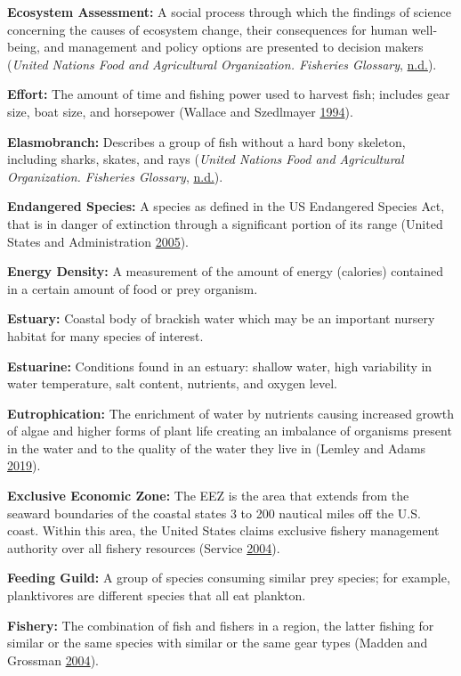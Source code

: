 \documentclass[
]{book}
\begin{document}
\textbf{Ecosystem Assessment:}
A social process through which the findings of science concerning the causes of ecosystem change, their consequences for human well-being, and management and policy options are presented to decision makers (\emph{United Nations Food and Agricultural Organization. Fisheries Glossary}, \protect\hyperlink{ref-unfao}{n.d.}).

\textbf{Effort:}
The amount of time and fishing power used to harvest fish; includes gear size, boat size, and horsepower (Wallace and Szedlmayer \protect\hyperlink{ref-wallace1994}{1994}).

\textbf{Elasmobranch:}
Describes a group of fish without a hard bony skeleton, including sharks, skates, and rays (\emph{United Nations Food and Agricultural Organization. Fisheries Glossary}, \protect\hyperlink{ref-unfao}{n.d.}).

\textbf{Endangered Species:}
A species as defined in the US Endangered Species Act, that is in danger of extinction through a significant portion of its range (United States and Administration \protect\hyperlink{ref-noaaglos}{2005}).

\textbf{Energy Density:}
A measurement of the amount of energy (calories) contained in a certain amount of food or prey organism.

\textbf{Estuary:}
Coastal body of brackish water which may be an important nursery habitat for many species of interest.

\textbf{Estuarine:}
Conditions found in an estuary: shallow water, high variability in water temperature, salt content, nutrients, and oxygen level.

\textbf{Eutrophication:}
The enrichment of water by nutrients causing increased growth of algae and higher forms of plant life creating an imbalance of organisms present in the water and to the quality of the water they live in (Lemley and Adams \protect\hyperlink{ref-ospar2003}{2019}).

\textbf{Exclusive Economic Zone:}
The EEZ is the area that extends from the seaward boundaries of the coastal states 3 to 200 nautical miles off the U.S. coast. Within this area, the United States claims exclusive fishery management authority over all fishery resources (Service \protect\hyperlink{ref-nmfs2004}{2004}).

\textbf{Feeding Guild:}
A group of species consuming similar prey species; for example, planktivores are different species that all eat plankton.

\textbf{Fishery:}
The combination of fish and fishers in a region, the latter fishing for similar or the same species with similar or the same gear types (Madden and Grossman \protect\hyperlink{ref-madden2004}{2004}).
\end{document}
